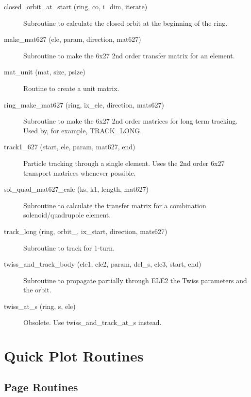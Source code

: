 \begin{description}

\item[closed\_orbit\_at\_start (ring, co, i\_dim, iterate)] \Newline
Subroutine to calculate the closed orbit at the beginning of the ring. 

\item[make\_mat627 (ele, param, direction, mat627)] \Newline
Subroutine to make the 6x27 2nd order transfer matrix for an element. 

\item[mat\_unit (mat, size, psize)] \Newline 
Routine to create a unit matrix.

\item[ring\_make\_mat627 (ring, ix\_ele, direction, mats627)] \Newline
Subroutine to make the 6x27 2nd order matrices for long term tracking. 
Used by, for example, TRACK\_LONG. 

\item[track1\_627 (start, ele, param, mat627, end)] \Newline
Particle tracking through a single element. Uses the 2nd order 6x27 transport 
matrices whenever possible. 

\item[sol\_quad\_mat627\_calc (ks, k1, length, mat627)] \Newline
Subroutine to calculate the transfer matrix for a combination solenoid/quadrupole element. 

\item[track\_long (ring, orbit\_, ix\_start, direction, mats627)] \Newline
Subroutine to track for 1-turn. 

\item[twiss\_and\_track\_body (ele1, ele2, param, del\_s, ele3, start, end)] \Newline
Subroutine to propagate partially through ELE2 the Twiss parameters and the orbit. 

\item[twiss\_at\_s (ring, s, ele)] \Newline
Obsolete. Use twiss\_and\_track\_at\_s instead. 

\end{description}

\section{Quick Plot Routines}
\label{r:qp}      


\subsection{Page Routines}

